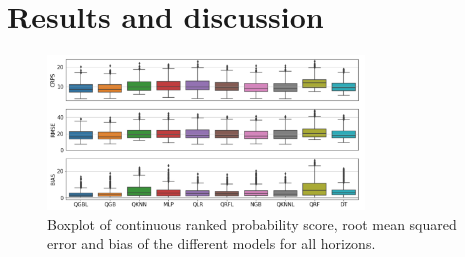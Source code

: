 \documentclass[a4paper,3p,sort&compress]{elsarticle}
\begin{document}
\section{Results and discussion}
\label{sec:results}

\begin{figure}[tbp]
  \centering
  \includegraphics[width=0.75\textwidth]{error_graph}
  \caption{\label{figure:errorGraph}
    Boxplot of continuous ranked probability score, root mean squared
    error and bias of the different models for all horizons.
  }
\end{figure}
\end{document}
